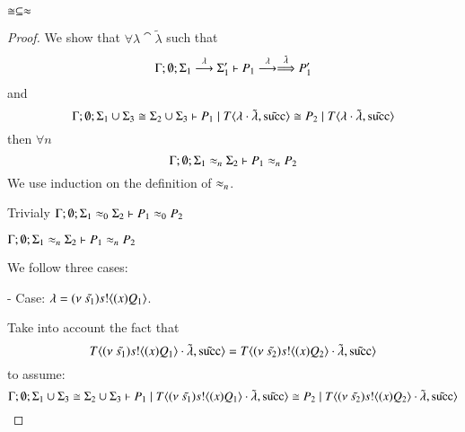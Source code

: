 \begin{lemma}\rm
	\label{lem:cong_is_wb}
	$\cong \subseteq \approx$
\end{lemma}

\begin{proof}
	\noi We show that
	$\forall \lambda \cat \tilde{\lambda}$
	such that
	\begin{eqnarray}
		\Gamma; \emptyset; \Sigma_1 \stackrel{\lambda}{\longrightarrow} \Sigma_1' \vdash P_1 \stackrel{\lambda}{\longrightarrow} \stackrel{\tilde{\lambda}}{\Longrightarrow} P_1' \label{lem:cong_is_wb1}
	\end{eqnarray}
	\noi and 
	\[
		\Gamma; \emptyset; \Sigma_1 \cup \Sigma_3 \cong \Sigma_2 \cup \Sigma_3 \vdash P_1 \;|\; T\langle \lambda \cdot \tilde{\lambda}, \tilde{\textrm{succ}} \rangle \cong P_2 \;|\; T\langle \lambda \cdot \tilde{\lambda}, \tilde{\textrm{succ}} \rangle
	\]
	\noi then $\forall n$
	\[
		\Gamma; \emptyset; \Sigma_1 \approx_n \Sigma_2 \vdash P_1 \approx_n P_2
	\]
%
	\noi We use induction on the definition of $\approx_n$.

	 Trivialy $\Gamma; \emptyset; \Sigma_1 \approx_0 \Sigma_2 \vdash P_1 \approx_0 P_2$

	 $\Gamma; \emptyset; \Sigma_1 \approx_n \Sigma_2 \vdash P_1 \approx_n P_2$


	\noi We follow three cases:

	\noi - Case: $\lambda = (\nu\ \tilde{s_1}) s ! \langle (x)Q_1 \rangle$.

	\noi Take into account the fact that
%
	\[
		T\langle (\nu\ \tilde{s_1}) s ! \langle (x)Q_1 \rangle \cdot \tilde{\lambda}, \tilde{\textrm{succ}} \rangle = T\langle (\nu\ \tilde{s_2}) s ! \langle (x)Q_2 \rangle \cdot \tilde{\lambda}, \tilde{\textrm{succ}} \rangle
	\]
%
	\noi to assume:
%
	\[
		\Gamma; \emptyset; \Sigma_1 \cup \Sigma_3 \cong \Sigma_2 \cup \Sigma_3  \vdash P_1 \;|\; T\langle (\nu\ \tilde{s_1}) s ! \langle (x)Q_1 \rangle \cdot \tilde{\lambda}, \tilde{\textrm{succ}} \rangle \cong P_2 \;|\; T\langle (\nu\ \tilde{s_2}) s ! \langle (x)Q_2 \rangle \cdot \tilde{\lambda}, \tilde{\textrm{succ}} \rangle
	\]


\end{proof}
